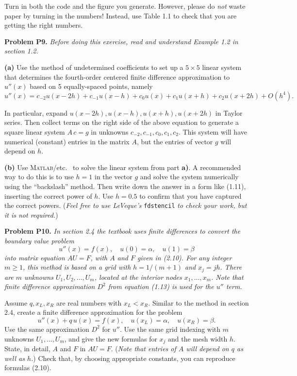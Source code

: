 \documentclass[12pt]{amsart}
\newcommand{\Matlab}{\textsc{Matlab}\xspace}
\newcommand{\prob}[1]{\bigskip\noindent\textbf{#1}\quad }
\newcommand{\epart}[1]{\medskip\noindent\textbf{(#1)}\quad }
\begin{document}
Turn in both the code and the figure you generate.  However, please do \emph{not} waste paper by turning in the numbers!  Instead, use Table 1.1 to check that you are getting the right numbers.


\prob{Problem P9.}  \emph{Before doing this exercise, read and understand Example 1.2 in section 1.2.}

\epart{a}  Use the method of undetermined coefficients to set up a $5\times 5$ linear system that determines the fourth-order centered finite difference approximation to $u''(x)$ based on 5 equally-spaced points, namely
\begin{equation*}
u''(x) = c_{-2} u(x-2h) + c_{-1} u(x-h) + c_0 u(x) + c_1 u(x+h) + c_2 u(x+2h) + O(h^4).
\end{equation*}

In particular, expand $u(x-2h), u(x-h), u(x+h), u(x+2h)$ in Taylor series.  Then collect terms on the right side of the above equation to generate a square linear system $A\,c=g$ in unknowns $c_{-2}, c_{-1}, c_0, c_1, c_2$.  This system will have numerical (constant) entries in the matrix $A$, but the entries of vector $g$ will depend on $h$.

\epart{b}  Use \Matlab/etc.~ to solve the linear system from part \textbf{a)}.  A recommended way to do this is to use $h=1$ in the vector $g$ and solve the system numerically using the ``backslash'' method.  Then write down the answer in a form like (1.11), inserting the correct power of $h$.  Use $h=0.5$ to confirm that you have captured the correct powers.  (\emph{Feel free to use LeVeque's} \texttt{fdstencil} \emph{to check your work, but it is not required.})


\prob{Problem P10.}  \emph{In section 2.4 the textbook uses finite differences to convert the boundary value problem}
    $$u''(x) = f(x), \quad u(0) = \alpha, \quad u(1) = \beta$$
\emph{into matrix equation $AU=F$, with $A$ and $F$ given in (2.10).  For any integer $m\ge 1$, this method is based on a grid with $h=1/(m+1)$ and $x_j=jh$.  There are $m$ unknowns $U_1,U_2,\dots,U_m$, located at the interior nodes $x_1,\dots,x_m$.  Note that finite difference approximation $D^2$ from equation (1.13) is used for the $u''$ term.}

Assume $q,x_L,x_R$ are real numbers with $x_L<x_R$.  Similar to the method in section 2.4, create a finite difference approximation for the problem
\begin{equation*}
u''(x) + q\, u(x) = f(x), \quad u(x_L) = \alpha, \quad u(x_R) = \beta. \end{equation*}
Use the same approximation $D^2$ for $u''$.  Use the same grid indexing with $m$ unknowns $U_1,\dots,U_m$, and give the new formulas for $x_j$ and the mesh width $h$.  State, in detail, $A$ and $F$ in $AU=F$.  (\emph{Note that entries of $A$ will depend on $q$ as well as $h$.})  Check that, by choosing appropriate constants, you can reproduce formulas (2.10).
\end{document}
